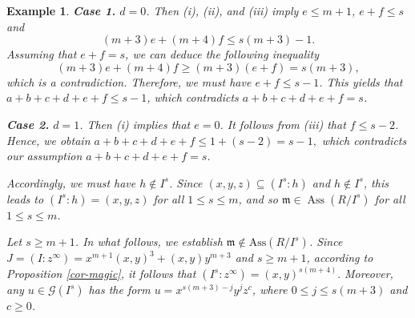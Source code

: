 \documentclass[11pt]{amsart}
\newtheorem{example}[theorem]{Example}
\begin{document}
\begin{example}
{\medskip
\textbf{Case 1.}  $d = 0$. Then (i), (ii), and (iii) imply  $e \le m+1$, $e + f \le s$ and 
$$(m+3)e + (m+4)f \le s(m+3) - 1.$$ 
Assuming that $e+f=s$,  we can deduce the following inequality
  $$(m+3)e + (m+4)f \ge (m+3)(e+f)=s(m+3),$$
  which is a  contradiction. Therefore, we must have $e + f \le s - 1$. This yields that 
  $a + b + c + d + e + f  \le s - 1$, which contradicts $a+b+c+d+e+f=s$. 
  
  \medskip
  \textbf{Case 2.}  $d = 1$. Then (i) implies that $e=0$. It follows from (iii) that $f\leq s-2$. Hence, we obtain $
  a + b + c + d + e + f \le 1 + (s - 2) = s - 1,$ which  contradicts our assumption $a + b + c + d + e+f = s$.   
  
Accordingly, we must have  $h \notin I^s$. Since  $(x,y,z) \subseteq (I^s : h)$ and $h \notin I^s$, this leads to 
 $(I^s : h) = (x,y,z)$ for all $1 \le s \le m$, and so $\mathfrak{m} \in \operatorname{Ass}(R/I^s)$ for all $1 \le s \le m$. 
 
 Let $s\geq m+1$. In what follows, we establish $\mathfrak{m}\notin \mathrm{Ass}(R/I^{s})$. 
Since $J=(I:z^{\infty})=x^{m+1}(x,y)^3+(x,y)y^{m+3}$ and $s\geq m+1$, according to Proposition \ref{cor-magic}, it follows that 
$(I^s:z^{\infty})=(x,y)^{s(m+4)}.$
Moreover, any $u\in \mathcal G(I^s)$ has the form $u=x^{s(m+3)-j}y^jz^c$, where $0\leq j\leq s(m+3)$ and $c\geq 0$.

}
\end{example}
\end{document}
